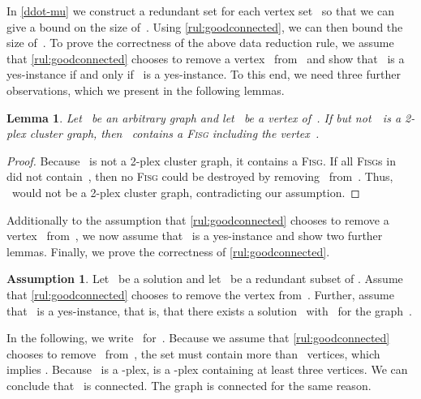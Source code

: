 \documentclass[12pt, a4paper, abstracton]{scrreprt}
\newcommand{\pl}[1]{\mbox{-plex}}
\newcommand{\FISG}{\textsc{Fisg}}
\newcounter{theorem}
\newtheorem{lemma}{Lemma}[chapter]
\theoremstyle{definition}
\newtheorem{asu}{Assumption}[chapter]
\theoremstyle{remark}
\begin{document}
\noindent In \autoref{ddot-mu} we construct a redundant set  for each vertex set~ so that we can give a bound on the size of~. Using \autoref{rul:goodconnected}, we can then bound the size of~.  To prove the correctness of the above data reduction rule, we assume that \autoref{rul:goodconnected} chooses to remove a vertex~ from~ and show that~ is a yes-instance if and only if~ is a yes-instance. To this end, we need three further observations, which we present in the following lemmas.

\begin{lemma}\label{FISG-has-v}
  Let~ be an arbitrary graph and let ~be a vertex of~. If  but not~~is a 2-plex cluster graph, then ~contains a \FISG{} including the vertex~.
\end{lemma}

\begin{proof}
  Because ~is not a 2-plex cluster graph, it contains a \FISG{}.  If all \FISG{}s in~ did not contain~, then no \FISG{} could be destroyed by removing ~from~. Thus, ~would not be a 2-plex cluster graph, contradicting our assumption.
\end{proof}

\noindent Additionally to the assumption that \autoref{rul:goodconnected} chooses to remove a vertex~ from~, we now assume that~ is a yes-instance and show two further lemmas. Finally, we prove the correctness of \autoref{rul:goodconnected}.

\begin{asu}\label{working-asu}
  Let~ be a solution and let ~be a redundant subset of . Assume that \autoref{rul:goodconnected} chooses to remove the vertex  from~. Further, assume that~ is a yes-instance, that is, that there exists a solution~ with~ for the graph~.
\end{asu}

\noindent In the following, we write ~for~. Because we assume that \autoref{rul:goodconnected} chooses to remove~ from~, the set  must contain more than~ vertices, which implies .
Because~ is a \pl 2,  is a \pl 2 containing at least three vertices. We can conclude that ~is connected. The graph  is connected for the same reason.
\end{document}
